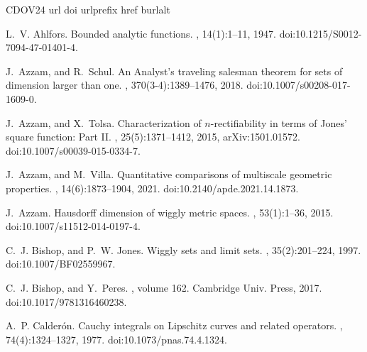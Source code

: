 \documentclass[11pt,reqno]{amsart}
\theoremstyle{definition}
\theoremstyle{remark}
\numberwithin{equation}{section}
\theoremstyle{theorem}
\theoremstyle{definition}
\theoremstyle{remark}
\numberwithin{equation}{section}
\begin{document}
\begin{thebibliography}{CDOV24}
	\expandafter\ifx\csname url\endcsname\relax
	\def\url#1{\texttt{#1}}\fi
	\expandafter\ifx\csname doi\endcsname\relax
	\def\doi#1{\burlalt{doi:#1}{http://dx.doi.org/#1}}\fi
	\expandafter\ifx\csname urlprefix\endcsname\relax\def\urlprefix{URL }\fi
	\expandafter\ifx\csname href\endcsname\relax
	\def\href#1#2{#2}\fi
	\expandafter\ifx\csname burlalt\endcsname\relax
	\def\burlalt#1#2{\href{#2}{#1}}\fi
	
	L.~V. Ahlfors.
	\newblock Bounded analytic functions.
	, 14(1):1--11, 1947.
	\newblock \doi{10.1215/S0012-7094-47-01401-4}.
	
	J.~Azzam, and R.~Schul.
	\newblock An {Analyst’s} traveling salesman theorem for sets of dimension
	larger than one.
	, 370(3-4):1389--1476, 2018.
	\newblock \doi{10.1007/s00208-017-1609-0}.
	
	J.~Azzam, and X.~Tolsa.
	\newblock Characterization of $n$-rectifiability in terms of {Jones'} square
	function: Part {II}.
	, 25(5):1371--1412, 2015,
	\burlalt{arXiv:1501.01572}{http://arxiv.org/abs/1501.01572}.
	\newblock \doi{10.1007/s00039-015-0334-7}.
	
	J.~Azzam, and M.~Villa.
	\newblock Quantitative comparisons of multiscale geometric properties.
	, 14(6):1873--1904, 2021.
	\newblock \doi{10.2140/apde.2021.14.1873}.
	
	J.~Azzam.
	\newblock Hausdorff dimension of wiggly metric spaces.
	, 53(1):1--36, 2015.
	\newblock \doi{10.1007/s11512-014-0197-4}.
	
	C.~J. Bishop, and P.~W. Jones.
	\newblock Wiggly sets and limit sets.
	, 35(2):201--224, 1997.
	\newblock \doi{10.1007/BF02559967}.
	
	C.~J. Bishop, and Y.~Peres.
	, volume 162.
	\newblock Cambridge Univ. Press, 2017.
	\newblock \doi{10.1017/9781316460238}.
	
	A.~P. Calder{\ifmmode{}\else\'{o}\fi}n.
	\newblock Cauchy integrals on {Lipschitz} curves and related operators.
	, 74(4):1324--1327, 1977.
	\newblock \doi{10.1073/pnas.74.4.1324}.
	

\end{thebibliography}
\end{document}
